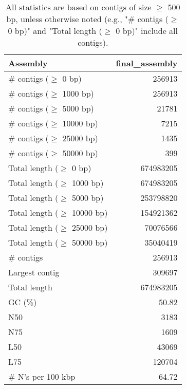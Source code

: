 \documentclass[12pt,a4paper]{article}
\begin{document}
\begin{table}[ht]
\begin{center}
\caption{All statistics are based on contigs of size $\geq$ 500 bp, unless otherwise noted (e.g., "\# contigs ($\geq$ 0 bp)" and "Total length ($\geq$ 0 bp)" include all contigs).}
\begin{tabular}{|l*{1}{|r}|}
\hline
Assembly & final\_assembly \\ \hline
\# contigs ($\geq$ 0 bp) & 256913 \\ \hline
\# contigs ($\geq$ 1000 bp) & 256913 \\ \hline
\# contigs ($\geq$ 5000 bp) & 21781 \\ \hline
\# contigs ($\geq$ 10000 bp) & 7215 \\ \hline
\# contigs ($\geq$ 25000 bp) & 1435 \\ \hline
\# contigs ($\geq$ 50000 bp) & 399 \\ \hline
Total length ($\geq$ 0 bp) & 674983205 \\ \hline
Total length ($\geq$ 1000 bp) & 674983205 \\ \hline
Total length ($\geq$ 5000 bp) & 253798820 \\ \hline
Total length ($\geq$ 10000 bp) & 154921362 \\ \hline
Total length ($\geq$ 25000 bp) & 70076566 \\ \hline
Total length ($\geq$ 50000 bp) & 35040419 \\ \hline
\# contigs & 256913 \\ \hline
Largest contig & 309697 \\ \hline
Total length & 674983205 \\ \hline
GC (\%) & 50.82 \\ \hline
N50 & 3183 \\ \hline
N75 & 1609 \\ \hline
L50 & 43069 \\ \hline
L75 & 120704 \\ \hline
\# N's per 100 kbp & 64.72 \\ \hline
\end{tabular}
\end{center}
\end{table}
\end{document}
